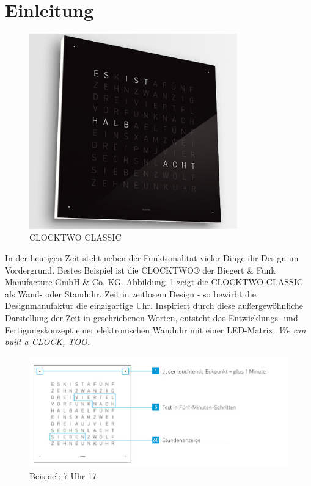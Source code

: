 
\section{Einleitung}
\label{sec:Einleitung}

\begin{figure}[t]
    \centering
    \includegraphics[width=9cm]{Abbildungen/qlocktwo-wand}
    \caption[ClockTwo]{CLOCKTWO CLASSIC}
    \label{fig:ClockTwo}
\end{figure}
%
 \begin{multicols}{2}
 In der heutigen Zeit steht neben der Funktionalität vieler Dinge ihr Design im Vordergrund. Bestes Beispiel ist die CLOCKTWO® der Biegert \&  Funk Manufacture GmbH \& Co. KG. Abbildung~\ref{fig:ClockTwo} zeigt die CLOCKTWO CLASSIC als Wand- oder Standuhr. %
 Zeit in zeitlosem Design -   so bewirbt die Designmanufaktur die einzigartige Uhr.  Inspiriert durch diese außergewöhnliche Darstellung der Zeit in geschriebenen Worten, entsteht das Entwicklungs- und Fertigungskonzept einer elektronischen Wanduhr mit einer LED-Matrix. \textit{We can built a CLOCK, TOO.}
 \end{multicols}
 \begin{figure}[h]
    \centering
    \includegraphics[width=13cm]{Abbildungen/Uhrzeit_Beispiel}
    \caption[Uhrzeit_Bspl]{Beispiel: 7 Uhr 17}
    \label{fig:Uhrzeit_Bspl}
\end{figure}
